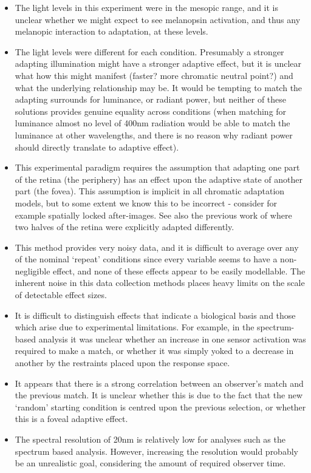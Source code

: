 \begin{itemize}
\item The light levels in this experiment were in the mesopic range, and it is unclear whether we might expect to see melanopsin activation, and thus any melanopic interaction to adaptation, at these levels.
\item The light levels were different for each condition. Presumably a stronger adapting illumination might have a stronger adaptive effect, but it is unclear what how this might manifest (faster? more chromatic neutral point?) and what the underlying relationship may be. It would be tempting to match the adapting surrounds for luminance, or radiant power, but neither of these solutions provides genuine equality across conditions (when matching for luminance almost no level of 400nm radiation would be able to match the luminance at other wavelengths, and there is no reason why radiant power should directly translate to adaptive effect).
\item This experimental paradigm requires the assumption that adapting one part of the retina (the periphery) has an effect upon the adaptive state of another part (the fovea). This assumption is implicit in all chromatic adaptation models, but to some extent we know this to be incorrect - consider for example spatially locked after-images. See also the previous work of \citet{macadam_chromatic_1956} where two halves of the retina were explicitly adapted differently.
\item This method provides very noisy data, and it is difficult to average over any of the nominal `repeat' conditions since every variable seems to have a non-negligible effect, and none of these effects appear to be easily modellable. The inherent noise in this data collection methods places heavy limits on the scale of detectable effect sizes.
\item It is difficult to distinguish effects that indicate a biological basis and those which arise due to experimental limitations. For example, in the spectrum-based analysis it was unclear whether an increase in one sensor activation was required to make a match, or whether it was simply yoked to a decrease in another by the restraints placed upon the response space.
\item It appears that there is a strong correlation between an observer's match and the previous match. It is unclear whether this is due to the fact that the new `random' starting condition is centred upon the previous selection, or whether this is a foveal adaptive effect.
\item The spectral resolution of 20nm is relatively low for analyses such as the spectrum based analysis. However, increasing the resolution would probably be an unrealistic goal, considering the amount of required observer time.
\end{itemize}


